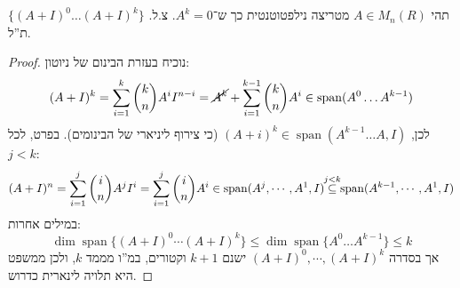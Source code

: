 \documentclass[]{article}
\DeclareMathOperator{\Sp}     {span}
\theoremstyle{definition}
\begin{document}
    \section{}
    תהי $A \in M_n(R)$ מטריצה נילפטוטנטית כך ש־$A^k = 0$. צ.ל. $\{(A + I)^0 \dots (A + I)^{k}\}$ ת''ל. 
    \begin{proof}
        נוכיח בעזרת הבינום של ניוטון: 
        \[ (A + I)^k = \sum_{i = 1}^{k}\binom{k}{n}A^iI^{n - i} = \cancel{A^k} + \sum_{i = 1}^{k-1}\binom{k}{n}A^i \in \Sp(A^{0} \dots A^{k - 1}) \]
        לכן, $ (A + i)^k \in \Sp(A^{k - 1} \dots A, I)$ (כי צירוף ליניארי של הבינומים). בפרט, לכל $j < k$: 
        \[ (A + I)^n = \sum_{i = 1}^{j}\binom{i}{n}A^jI^i = \sum_{i = 1}^{j}\binom{i}{n}A^i \in \Sp (A^j, \cdots, A^1, I) \overset{\mathclap{j < k}}{\subseteq} \Sp (A^{k - 1}, \cdots, A^1, I) \]
        במילים אחרות: 
        \[ \dim \Sp\{(A + I)^0 \cdots (A + I)^{k}\} \le \dim \Sp\{A^0 \dots A^{k - 1}\} \le k \]
        אך בסדרה $(A + I)^{0}, \cdots, (A + I)^{{k}}$ ישנם $k + 1$ וקטורים, במ''ו מממד $k$, ולכן ממשפט היא תלויה לינארית כדרוש. 
    \end{proof}
    
\end{document}
